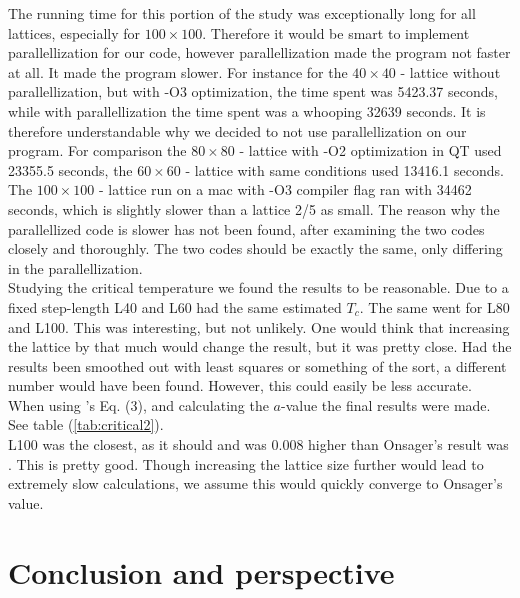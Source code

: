 \documentclass{article}
\begin{document}
The running time for this portion of the study was exceptionally long for all lattices, especially for $100 \times 100$. Therefore it would be smart to implement parallellization for our code, however parallellization made the program not faster at all. It made the program slower. For instance for the $40 \times 40$ - lattice
without parallellization, but with -O3 optimization, the time spent was 5423.37 seconds, while with parallellization the time spent was a whooping 32639 seconds. It is therefore understandable why we decided to not use parallellization on our program. For comparison the $80 \times 80$ - lattice with -O2 optimization in QT used 23355.5 seconds, the $60 \times 60$ - lattice with same conditions used 13416.1 seconds. The $100 \times 100$ - lattice run on a mac with -O3 compiler flag ran with 34462 seconds, which is slightly slower than a lattice 2/5 as small. The reason why the parallellized code is slower has not been found, after examining the two codes closely and thoroughly. The two codes should be exactly the same, only differing in the parallellization. \\




Studying the critical temperature we found the results to be reasonable. Due to a fixed step-length L40 and L60 had the same estimated $T_c$. The same went for L80 and L100. This was interesting, but not unlikely. One would think that increasing the lattice by that much would change the result, but it was pretty close. Had the results been smoothed out with least squares or something of the sort, a different number would have been found. However, this could easily be less accurate. When using \cite{task}'s Eq. (3), and calculating the $a$-value the final results were made. See table (\ref{tab:critical2}). \\

L100 was the closest, as it should and was 0.008 higher than Onsager's result was \cite{onsager}. This is pretty good.
Though increasing the lattice size further would lead to extremely slow calculations, we assume this would quickly converge to Onsager's value. \\


\vspace{1cm}

\section{Conclusion and perspective} \label{sec:Conclusion}
\end{document}
